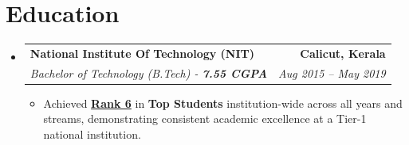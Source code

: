 \documentclass[letterpaper,12pt]{article}
\makeatletter
\newcommand{\resumeItem}[1]{
  \item\small{
    {#1}
  }
}
\newcommand{\resumeSubheading}[4]{
  \vspace{4pt}\item
    \begin{tabular*}{1.0\textwidth}[t]{l@{\extracolsep{\fill}}r}
      \textbf{#1} & \textbf{\small #2} \\
      \textit{\small#3} & \textit{\small #4} \\
    \end{tabular*}\vspace{2pt}
}
\newcommand{\resumeSubHeadingListStart}{\begin{itemize}[leftmargin=0.0in, label={}]}
\newcommand{\resumeSubHeadingListEnd}{\end{itemize}}
\newcommand{\resumeItemListStart}{\begin{itemize}}
\newcommand{\resumeItemListEnd}{\end{itemize}\vspace{-2pt}}
\makeatother
\begin{document}
\section{Education}
\vspace{-2pt}
  \resumeSubHeadingListStart
    \resumeSubheading
      {National Institute Of Technology (NIT)}{Calicut, Kerala}
      {Bachelor of Technology (B.Tech) - \textbf{7.55 CGPA}}{Aug 2015 -- May 2019}
      \resumeItemListStart
        \resumeItem{Achieved \textbf{\href{https://www.university.youth4work.com/nit_calicut_national-institute-of-technology-calicut/report/5}{Rank 6}} in \textbf{Top Students} institution-wide across all years and streams, demonstrating consistent academic excellence at a Tier-1 national institution.}
        
      \resumeItemListEnd
  \resumeSubHeadingListEnd
\vspace{-6pt}
\end{document}
